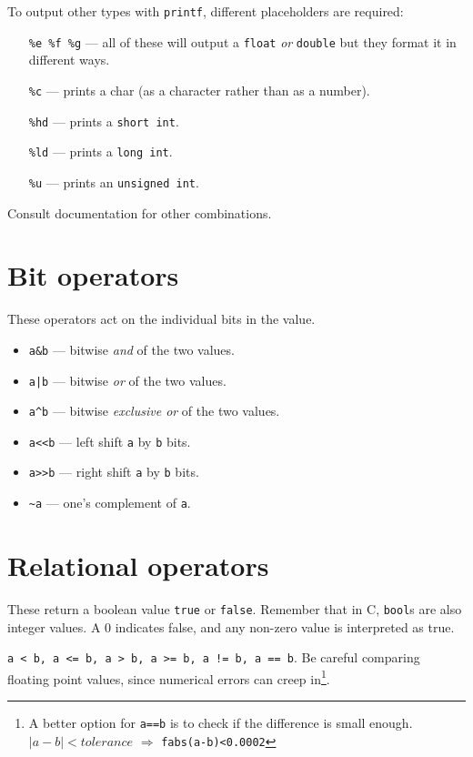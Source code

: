 To output other types with \texttt{printf}, different placeholders are required:
\begin{itemize}
 \item [\texttt{\%e \%f \%g}] --- all of these will output a \texttt{float} \emph{or} \texttt{double} but they format it in different ways.
 \item [\texttt{\%c}] --- prints a char (as a character rather than as a number).
 \item [\texttt{\%hd}] --- prints a \texttt{short int}.
 \item [\texttt{\%ld}] --- prints a \texttt{long int}.
 \item [\texttt{\%u}]  --- prints an \texttt{unsigned int}.
\end{itemize}
Consult documentation for other combinations.

\section{Bit operators}

These operators act on the individual bits in the value.

\begin{itemize}
 \item \lstinline|a&b| --- bitwise \emph{and} of the two values.
 \item \lstinline:a|b: --- bitwise \emph{or} of the two values.
 \item \lstinline|a^b| --- bitwise \emph{exclusive or} of the two values.
 \item \lstinline|a<<b| --- left shift \texttt{a} by \texttt{b} bits.
 \item \lstinline|a>>b| --- right shift \texttt{a} by \texttt{b} bits.
 \item \lstinline|~a| --- one's complement of \texttt{a}.
\end{itemize}

\section{Relational operators}

These return a boolean value \texttt{true} or \texttt{false}.
Remember that in C, \texttt{bool}s are also integer values.
A 0 indicates false, and any non-zero value is interpreted as true.

\lstinline|a < b, a <= b, a > b, a >= b, a != b, a == b|.
Be careful comparing floating point values, since numerical errors can 
creep in\footnote{A better option for \texttt{a==b} is to check if the difference is small 
enough. $|a-b|<tolerance$ $\Rightarrow$ \lstinline!fabs(a-b)<0.0002!}.

